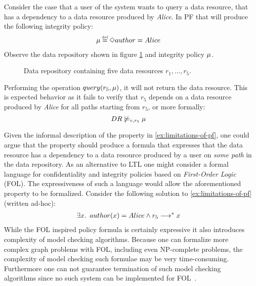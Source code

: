 \begin{example}\label{ex:limitations-of-pf}
Consider the case that a user of the system wants to query a data resource, that has a dependency to a data resource produced by \emph{Alice}. In PF that will produce the following integrity policy:
\begin{align*}
    \inte \eqdef \F author = Alice
\end{align*}
Observe the data repository shown in figure \ref{fig:pf-limitations} and integrity policy $\mu$.
\begin{figure}[!ht]
    \centering
    
    \caption{Data repository containing five data resources $r_1,\ldots,r_5$.}
    \label{fig:pf-limitations}
\end{figure}
Performing the operation $query(r_5, \mu)$, it will not return the data resource. This is expected behavior as it fails to verify that $r_5$ depends on a data resource produced by \emph{Alice} for all paths starting from $r_5$, or more formally:
\begin{equation*}
    DR \not\models_{c,r_5} \mu
\end{equation*}
\end{example}
Given the informal description of the property in \autoref{ex:limitations-of-pf}, one could argue that the property should produce a formula that expresses that the data resource has a dependency to a data resource produced by a user on \emph{some path} in the data repository. As an alternative to LTL one might consider a formal language for confidentiality and integrity policies based on \emph{First-Order Logic} (FOL). The expressiveness of such a language would allow the aforementioned property to be formalized. Consider the following solution to \autoref{ex:limitations-of-pf} (written ad-hoc):
\begin{align*}
    \exists x.\enskip author(x) = Alice \land r_5 \longrightarrow^\ast x
\end{align*}
While the FOL inspired policy formula is certainly expressive it also introduces complexity of model checking algorithms. Because one can formalize more complex graph problems with FOL, including even NP-complete problems, the complexity of model checking such formulae may be very time-consuming. Furthermore one can not guarantee termination of such model checking algorithms since no such system can be implemented for FOL~\cite{church1936note}.

